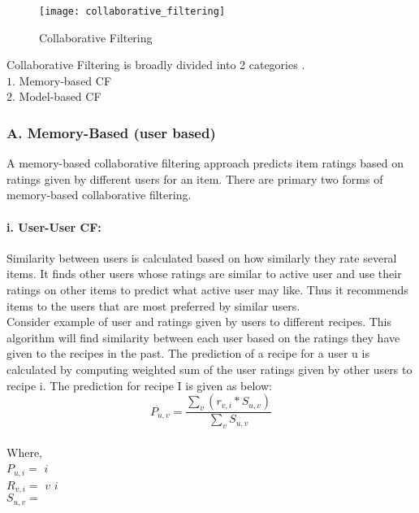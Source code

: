 \begin{figure}[H]
	\centering
	\texttt{[image: collaborative\_filtering]}
	\caption{Collaborative Filtering \cite{8}}
	\label{fig:collaborative_filtering}
\end{figure}


Collaborative Filtering is broadly divided into 2 categories \cite{11}. 
\\
$1.$ Memory-based CF
\\
$2.$ Model-based CF
\\
\subsubsection{A. Memory-Based (user based)}
A memory-based collaborative filtering approach predicts item ratings based on ratings given by different users for an item. There are primary two forms of memory-based collaborative filtering.
\paragraph{i. User-User CF:} 

Similarity between users is calculated based on how similarly they rate several items. It finds other users whose ratings are similar to active user and use their ratings on other items to predict what active user may like. Thus it recommends items to the users that are most preferred by similar users.
\\
Consider example of user and ratings given by users to different recipes. This algorithm will find similarity between each user based on the ratings they have given to the recipes in the past. The prediction of a recipe for a user u is calculated by computing weighted sum of the user ratings given by other users to recipe i.
The prediction for recipe I is given as below:
\\
\begin{equation}
P_{u,v} = \frac { \sum_v(r_{v,i} * S_{u,v})}{\sum_v S_{u,v}}
\end{equation}
\\
Where, 
\\
\noindent
$P_{u,i} = $  $i$ 
\\
$R_{v,i} = $  $v$  $i$ 
\\
$S_{u,v} = $ 
\\

